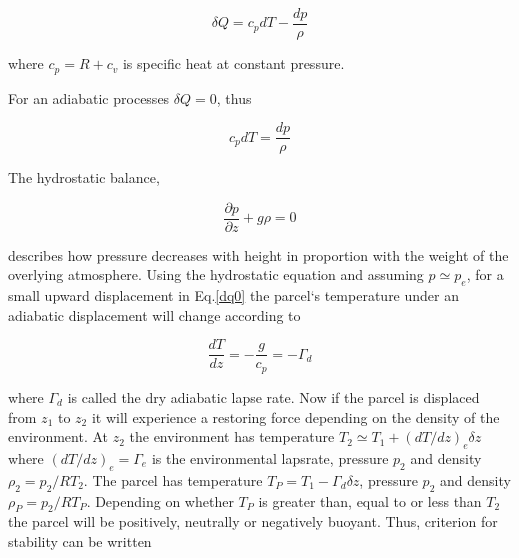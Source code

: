 \begin{equation}
    \delta Q = c_pdT - \frac{dp}{\rho}
    \label{thermo1}
\end{equation}

where $c_p = R + c_v$ is specific heat at constant pressure. 

For an adiabatic processes $\delta Q = 0$, thus

\begin{equation}
    c_pdT = \frac{dp}{\rho}
    \label{dq0}
\end{equation}

The hydrostatic balance,

\begin{equation}
    \frac{\partial p}{\partial z} +g\rho = 0
\end{equation}

describes how pressure decreases with height in proportion with the weight of the overlying atmosphere. Using the hydrostatic equation and assuming $p \simeq p_{e}$, for a small upward displacement in Eq.\eqref{dq0} the parcel`s temperature under an adiabatic displacement will change according to

\begin{equation}
    \frac{dT}{dz} = -\frac{g}{c_p} = - \Gamma_d
    \label{drylaps}
\end{equation}

where $\Gamma_d$ is called the dry adiabatic lapse rate. Now if the parcel is displaced from $z_1$ to $z_2$ it will experience a restoring force depending on the density of the environment. At $z_2$ the environment has temperature $T_2 \simeq T_1 + (dT/dz)_e \delta z$ where $(dT/dz)_e = \Gamma_e$ is the environmental lapsrate, pressure $p_2$ and density $\rho_2 = p_2/RT_2$. The parcel has temperature $T_P = T_1 - \Gamma_d\delta z$, pressure $p_2$ and density $\rho_P = p_2/RT_P$. Depending on whether $T_P$ is greater than, equal to or less than $T_2$ the parcel will be positively, neutrally or negatively buoyant. Thus, criterion for stability can be written

